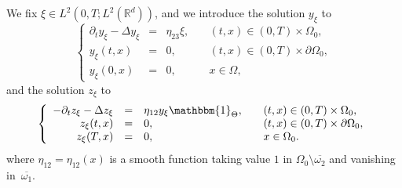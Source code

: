 \documentclass[JEP,XML,SOM,Unicode,NoFloatCountersInSection]{cedram}
\newcommand\R{{\mathbb R}}
\theoremstyle{definition}
\begin{document}
We fix $\xi \in L^2(0,T; L^2(\R^d))$, and we introduce the solution $y_\xi$ to
\begin{equation*}
\left\{
\begin{array}{rcll}
\partial_t y_\xi - \Delta y_\xi &=& \eta_{23} \xi, \quad & (t,x) \in (0,T) \times \Omega_0,
\\
y_\xi(t, x) &=& 0, \quad & (t,x) \in (0,T) \times \partial \Omega_0,
\\
y_\xi(0,x) &=& 0, \quad & x \in \Omega,
\end{array}
\right.
\end{equation*}
and the solution $z_\xi$ to
\begin{equation}
\label{Heat-Eq-Adjoint-z-f}
\left\{
\begin{array}{rcll}
- \partial_t z_\xi - \Delta z_\xi & =& \eta_{12} y_\xi \mathbbm{1}_{\Theta}, \quad & (t,x) \in (0,T) \times \Omega_0,
\\
z_\xi(t, x) &=& 0, \quad & (t,x) \in (0,T) \times \partial \Omega_0,
\\
z_\xi(T,x) &=& 0, \quad & x \in \Omega_0.
\end{array}
\right.
\end{equation}
where $\eta_{12} \!=\! \eta_{12}(x)$ is a smooth function taking value $1$ in $\Omega_0 \setminus \overline{\omega_2}$ and vanishing in~$\overline{\omega_1}$.
\end{document}

